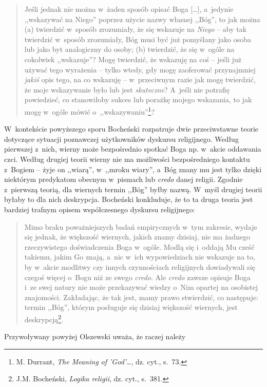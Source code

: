 \begin{quote}
Jeśli jednak nie można w~żaden sposób opisać Boga [\ldots], a~jedynie ,,wskazywać na Niego'' poprzez użycie nazwy własnej ,,Bóg'', to jak można (a) twierdzić w~sposób zrozumiały, że się wskazuje na \textit{Niego} -- aby tak twierdzić w~sposób zrozumiały, Bóg musi być już pomyślany jako osoba lub jako byt analogiczny do osoby; (b) twierdzić, że się w~ogóle na cokolwiek ,,wskazuje''? Mogę twierdzić, że wskazuję na coś -- jeśli już używać tego wyrażenia -- tylko wtedy, gdy mogę zaoferować przynajmniej \textit{jakiś} opis tego, na co wskazuję -- w~przeciwnym razie jak mogę twierdzić, że moje wskazywanie było lub jest \textit{skuteczne}? A~jeśli nie potrafię powiedzieć, co stanowiłoby sukces lub porażkę mojego wskazania, to jak mogę w~ogóle mówić o~,,wskazywaniu''\footnote{M. Durrant, \textit{The Meaning of 'God'}\ldots, dz. cyt., s.~73.}?
\end{quote}

W~kontekście powyższego sporu Bocheński rozpatruje dwie przeciwstawne teorie dotyczące sytuacji poznawczej użytkowników dyskursu religijnego. Według pierwszej z~nich, wierny może bezpośrednio spotkać Boga np. w~akcie oddawania czci. Według drugiej teorii wierny nie ma możliwości bezpośredniego kontaktu z~Bogiem -- żyje on ,,wiarą'', w~,,mroku wiary'', a~Bóg znany mu jest tylko dzięki niektórym predykatom obecnym w~pismach lub \textit{credo} danej religii. Zgodnie z~pierwszą teorią, dla wiernych termin ,,Bóg'' byłby nazwą. W~myśl drugiej teorii byłaby to dla nich deskrypcja. Bocheński konkluduje, że to ta druga teoria jest bardziej trafnym opisem współczesnego dyskursu religijnego:

\begin{quote}
Mimo braku poważniejszych badań empirycznych w~tym zakresie, wydaje się jednak, że większość wiernych, jakich znamy dzisiaj, nie ma żadnego rzeczywistego doświadczenia Boga w~ogóle. Modlą się i~oddają Mu cześć takiemu, jakim Go znają, a~nic w~ich wypowiedziach nie wskazuje na to, by w~akcie modlitwy czy innych czynnościach religijnych dowiadywali się czegoś więcej o~Bogu niż ze swego \textit{credo}. Ale \textit{credo} zawsze opisuje Boga i~ze swej natury nie może przekazywać wiedzy o~Nim opartej na osobistej znajomości. Zakładając, że tak jest, mamy prawo stwierdzić, co następuje: termin ,,Bóg'', którym posługuje się dzisiaj większość wiernych, jest deskrypcją\footnote{J.M. Bocheński, \textit{Logika religii}, dz. cyt., s.~381.}.
\end{quote}
Przywoływany powyżej Olszewski uważa, że raczej należy

